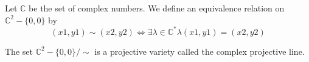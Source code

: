 \documentclass[12pt]{article}
\begin{document}
Let $\mathbb C$ be the set of complex numbers. We define an equivalence relation on $\mathbb C^2-\{0,0\}$ by 
\begin{equation}
(x1,y1) \sim (x2,y2) \Leftrightarrow \exists \lambda \in \mathbb C^* \lambda (x1,y1)=(x2,y2)
\end{equation}

The set $\mathbb C^2-\{0,0\}/\sim$ is a projective variety called the complex projective line.
\end{document}

